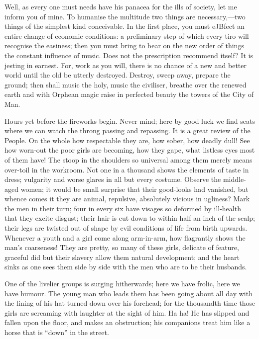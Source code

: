 Well, as every one must needs have his panacea for the ills of society,
let me inform you of mine. To humanise the multitude two things are
necessary,---two things of the simplest kind conceivable. In the first
place, you must eJBfect an entire change of economic conditions: a
preliminary step of which every tiro will recognise the easiness; then
you {}must bring to bear on the new order of things the constant
influence of music. Does not the prescription recommend itself? It is
jesting in earnest. For, work as you will, there is no chance of a new
and better world until the old be utterly destroyed. Destroy, sweep
away, prepare the ground; then shall music the holy, music the
civiliser, breathe over the renewed earth and with Orphean magic raise
in perfected beauty the towers of the City of Man.

Hours yet before the fireworks begin. Never mind; here by good luck we
find seats where we can watch the throng passing and repassing. It is a
great review of the People. On the whole how respectable they are, how
sober, how deadly dull! See how worn-out the poor girls are becoming,
how they gape, what listless eyes most of them have! The stoop in the
shoulders so universal among them merely means over-toil in the
workroom. Not one in a thousand shows the elements of taste in dress;
vulgarity and worse glares in all but every costume. Observe the
{}middle-aged women; it would be small surprise that their good-looks
had vanished, but whence comes it they are animal, repulsive, absolutely
vicious in ugliness? Mark the men in their turn; four in every six have
visages so deformed by ill-health that they excite disgust; their hair
is cut down to within half an inch of the scalp; their legs are twisted
out of shape by evil conditions of life from birth upwards. Whenever a
youth and a girl come along arm-in-arm, how flagrantly shows the man's
coarseness! They are pretty, so many of these girls, delicate of
feature, graceful did but their slavery allow them natural development;
and the heart sinks as one sees them side by side with the men who are
to be their husbands.

One of the livelier groups is surging hitherwards; here we have frolic,
here we have humour. The young man who leads them has been going about
all day with the lining of his hat turned down over his forehead; for
the thousandth time those girls are screaming with laughter at the sight
of him. Ha ha! {}He has slipped and fallen upon the floor, and makes an
obstruction; his companions treat him like a horse that is ``down'' in
the street.

